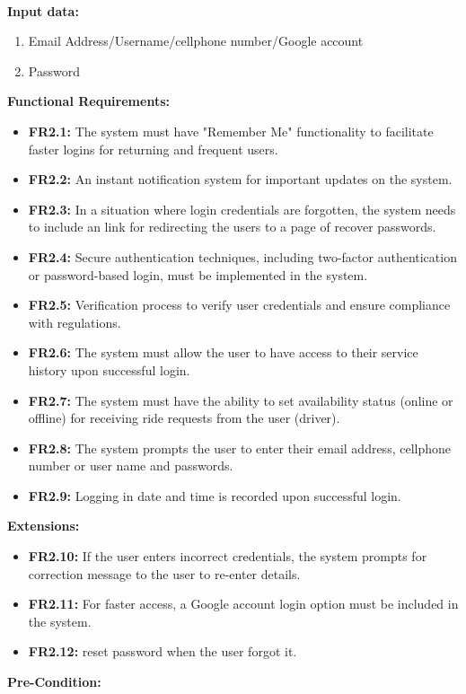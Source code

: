 \documentclass[9pt]{report}
\begin{document}
\textbf{\\Input data:}
\begin{enumerate}
    \item Email Address/Username/cellphone number/Google account
    \item Password
\end{enumerate}
\textbf{Functional Requirements:}
\begin{itemize}
    \item \textbf{FR2.1:} The system must have "Remember Me" functionality to facilitate faster logins for returning and frequent users.
    \item \textbf{FR2.2:} An instant notification system for important updates on the system.
    \item \textbf{FR2.3:} In a situation where login credentials are forgotten, the system needs to include an link for redirecting the users to a page of recover passwords. 
    \item \textbf{FR2.4:} Secure authentication techniques, including two-factor authentication or password-based login, must be implemented in the system.
    \item \textbf{FR2.5:} Verification process to verify user credentials and ensure compliance with regulations. 
    \item \textbf{FR2.6:} The system must allow the user to have access to their service history upon successful login.
    \item \textbf{FR2.7:} The system must have the ability to set availability status (online or offline) for receiving ride requests from the user (driver).
    \item \textbf{FR2.8:} The system prompts the user to enter their email address, cellphone number or user name and passwords.
    \item \textbf{FR2.9:} Logging in date and time is recorded upon successful login.
\end{itemize}
\textbf{Extensions:}
\begin{itemize}
    \item \textbf{FR2.10:} If the user enters incorrect credentials, the system prompts for correction message to the user to re-enter details.
    \item \textbf{FR2.11:}  For faster access, a Google account login option must be included in the system.
    \item \textbf{FR2.12:}  reset password when the user forgot it.
\end{itemize}
\textbf{Pre-Condition:} 
\end{document}
